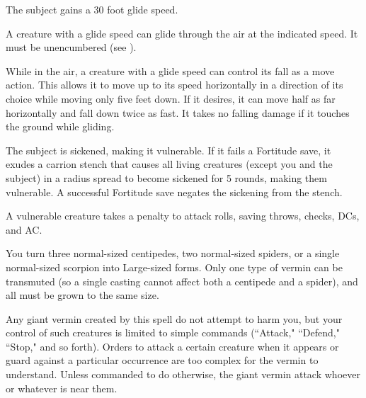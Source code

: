 \spellrng{\rngmed}
\spelldur{\durlong}
\begin{spelleffect}
  The subject gains a 30 foot glide speed.
\end{spelleffect}
\begin{spellnotes}
    A creature with a glide speed can glide through the air at the indicated speed. It must be unencumbered (see ).

    While in the air, a creature with a glide speed can control its fall as a move action. This allows it to move up to its speed horizontally in a direction of its choice while moving only five feet down. If it desires, it can move half as far horizontally and fall down twice as fast. It takes no falling damage if it touches the ground while gliding.
\end{spellnotes}

\spellrng{\rngtouch}
\spelldur{\durshort}
\begin{spelleffect}
  The subject is sickened, making it vulnerable. If it fails a Fortitude save, it exudes a carrion stench that causes all living creatures (except you and the subject) in a \areasmall radius spread to become sickened for 5 rounds, making them vulnerable. A successful Fortitude save negates the sickening from the stench.
\end{spelleffect}
\begin{spellnotes}
  A vulnerable creature takes a  penalty to attack rolls, saving throws, checks, DCs, and AC.
\end{spellnotes}

\spellrng{\rngclose}
\spelldur{\durmed}
\begin{spelleffect}
  You turn three normal-sized centipedes, two normal-sized spiders, or a single normal-sized scorpion into Large-sized forms. Only one type of vermin can be transmuted (so a single casting cannot affect both a centipede and a spider), and all must be grown to the same size.
  \par Any giant vermin created by this spell do not attempt to harm you, but your control of such creatures is limited to simple commands (``Attack," ``Defend," ``Stop," and so forth). Orders to attack a certain creature when it appears or guard against a particular occurrence are too complex for the vermin to understand. Unless commanded to do otherwise, the giant vermin attack whoever or whatever is near them.
\end{spelleffect}

